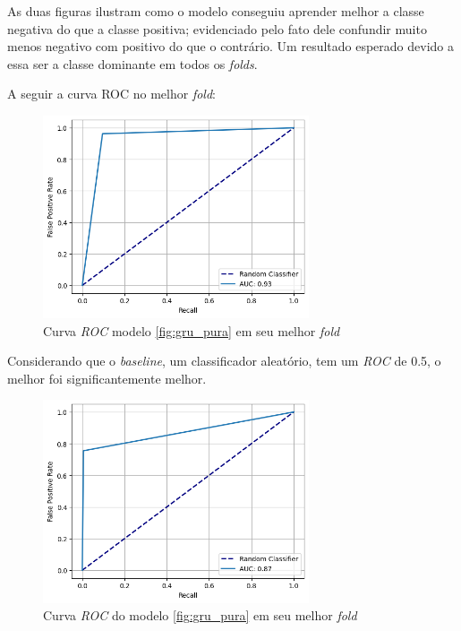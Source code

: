 \documentclass[
    12pt,                %
    openright,           %
    oneside,             %
    a4paper,             %
    brazil               %
]{abntex2}
\begin{document}
As duas figuras ilustram como o modelo conseguiu aprender melhor a classe negativa do que a classe positiva; evidenciado pelo fato dele confundir
muito menos negativo com positivo do que o contrário. Um resultado esperado devido a essa ser a classe dominante em todos os \textit{folds}.

A seguir a curva ROC no melhor \textit{fold}:


\begin{figure}[H]
  \centering
   \includegraphics[width=0.7\textwidth]{figuras/modelos_resultados/roc_gru_melhor_fold.png} %
  \caption{Curva \textit{ROC} modelo \ref{fig:gru_pura} em seu melhor \textit{fold}}
  \label{fig:roc_melhor_fold_gru}
\end{figure}

Considerando que o \textit{baseline}, um classificador aleatório, tem um \textit{ROC} de 0.5, o melhor foi significantemente melhor.

\begin{figure}[H]
  \centering
   \includegraphics[width=0.7\textwidth]{figuras/modelos_resultados/roc_gru_pior_fold.png} %
  \caption{Curva \textit{ROC} do modelo \ref{fig:gru_pura} em seu melhor \textit{fold}}
  \label{fig:roc_pior_fold_gru}
\end{figure}
\end{document}

